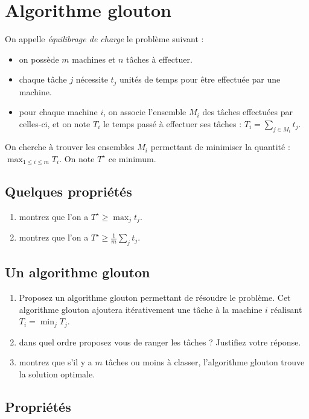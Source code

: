 \documentclass
[12pt]
{article}
\begin{document}
\section{Algorithme glouton}

On appelle {\em équilibrage de charge} le problème suivant : 

\begin{itemize}
    \item on possède $m$ machines et $n$ tâches à effectuer.
    \item chaque tâche $j$ nécessite $t_j$ unités de temps pour être effectuée par une machine.
    \item pour chaque machine $i$, on associe l'ensemble $M_i$ des tâches effectuées par celles-ci, et on note $T_i$ le temps passé à effectuer ses tâches : $T_i = \sum_{j \in M_i} t_j$.
\end{itemize}

On cherche à trouver les ensembles $M_i$ permettant de minimiser la quantité : $\max_{1\leq i \leq m} T_i$. On note $T^\star$ ce minimum.

\subsection{Quelques propriétés}
\begin{enumerate}
    \item montrez que l'on a $T^\star \geq \max_j t_j$.
    \item montrez que l'on a $T^\star \geq \frac{1}{m}\sum_j t_j$.
\end{enumerate}

\subsection{Un algorithme glouton}

\begin{enumerate}
    \item Proposez un algorithme glouton permettant de résoudre le problème. Cet algorithme glouton ajoutera itérativement une tâche à la machine $i$ réalisant $T_i = \min_j T_j$.
    \item dans quel ordre proposez vous de ranger les tâches ? Justifiez votre réponse.
    \item montrez que s'il y a $m$ tâches ou moins à classer, l'algorithme glouton trouve la solution optimale.
\end{enumerate}

\subsection{Propriétés}
\end{document}
